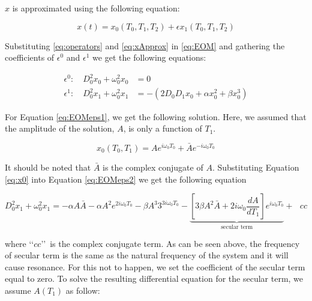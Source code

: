 $x$ is approximated using the following equation:

%
\begin{equation}\label{eq:xApprox}
	x(t) = x_0 (T_0, T_1, T_2) + 
	       \epsilon x_1 (T_0, T_1, T_2)
\end{equation}
%

Substituting \eqref{eq:operators} and \eqref{eq:xApprox} in \eqref{eq:EOM} and gathering the coefficients of $\epsilon^0$ and $\epsilon^1$ we get the following equations:

%
\begin{subequations}\label{eq:EOMeps}
\begin{align}
	\epsilon^0 : \quad D_{0}^{2} x_{0} + \omega_{0}^{2} x_{0} &= 0
	\label{eq:EOMeps1}
	\\
	\epsilon^1 : \quad D_{0}^{2} x_{1} + \omega_{0}^{2} x_{1} &= -
				 \left( 
				 2 D_{0} D_{1} x_{0} + 
				 \alpha x_0^2 + 
				 \beta x_0^3
				 \right)
	\label{eq:EOMeps2}
\end{align}
\end{subequations}
%

For Equation \eqref{eq:EOMeps1}, we get the following solution. Here, we assumed that the amplitude of the solution, $A$, is only a function of $T_1$. 

%
\begin{equation}\label{eq:x0}
	x_0 \left( T_0, T_1 \right) = 
	A e^{i\omega_0 T_0} + \bar{A} e^{-i\omega_0 T_0}
\end{equation}
%

It should be noted that $\bar{A}$ is the complex conjugate of $A$. Substituting Equation \eqref{eq:x0} into Equation \eqref{eq:EOMeps2} we get the following equation

%
\begin{equation}\label{eq:eqForX1}
D_{0}^{2} x_{1} + \omega_{0}^{2} x_{1} =
-\alpha A \bar{A}
-\alpha A^2 e^{2 i \omega_0 T_0}
-\beta A^3 3^{3i \omega_0 T_0}
-\underbrace{\left[
3\beta A^2 \bar{A} + 
2i\omega_0 \frac{dA}{dT_1}
\right]
e^{i \omega_{0} T_{0}}}_\text{secular term} + \text{ } cc
\end{equation}
%

where \lq\lq$cc$\rq\rq\ is the complex conjugate term. As can be seen above, the frequency of secular term is the same as the natural frequency of the system and it will cause resonance. For this not to happen, we set the coefficient of the secular term equal to zero. To solve the resulting differential equation for the secular term, we assume $A(T_1)$ as follow:

